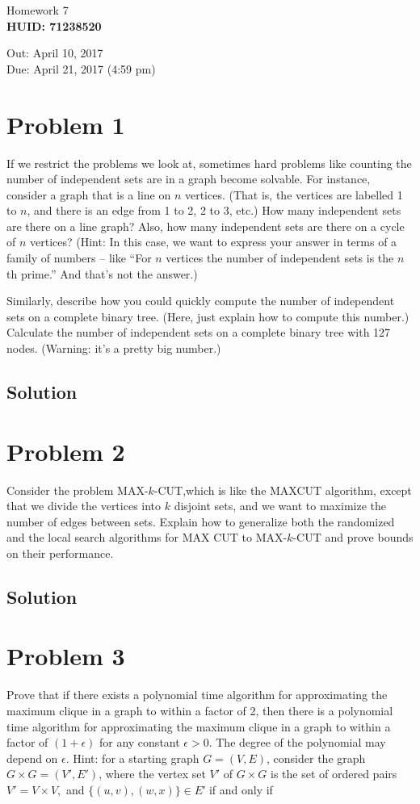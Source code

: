 \documentclass[11pt]{article}
\begin{document}
\begin{center} Homework 7 \\
\textbf{HUID: 71238520}
\end{center}
\begin{flushright}
Out: April 10, 2017\\
Due: April 21, 2017 (4:59 pm)
\end{flushright}

\section{Problem 1}
If we restrict the problems we look at, sometimes hard problems like counting the number of independent sets are in a graph become solvable. For instance, consider a graph that is a line on $n$ vertices. (That is, the vertices are labelled 1 to $n$, and there is an edge from 1 to 2, 2 to 3, etc.) How many independent sets are there on a line graph? Also, how many independent sets are there on a cycle of $n$ vertices? (Hint: In this case, we want to express your answer in terms of a family of numbers – like “For $n$ vertices the number of independent sets is the $n$th prime.” And that’s not the answer.)

Similarly, describe how you could quickly compute the number of independent sets on a complete binary tree. (Here, just explain how to compute this number.) Calculate the number of independent sets on a complete binary tree with 127 nodes. (Warning: it’s a pretty big number.)
\subsection{Solution}

\section{Problem 2}
Consider the problem MAX-$k$-CUT,which is like the MAXCUT algorithm, except that we divide the vertices into $k$ disjoint sets, and we want to maximize the number of edges between sets. Explain how to generalize both the randomized and the local search algorithms for MAX CUT to MAX-$k$-CUT and prove bounds on their performance.
\subsection{Solution}

\section{Problem 3}
Prove that if there exists a polynomial time algorithm for approximating the maximum clique in a graph to within a factor of 2, then there is a polynomial time algorithm for approximating the maximum clique in a graph to within a factor of $(1 + \epsilon)$ for any constant $\epsilon > 0$. The degree of the polynomial may depend on $\epsilon$. Hint: for a starting graph $G = (V,E)$, consider the graph $G \times G = (V′,E′)$, where the vertex set $V′$ of $G \times G$ is the set of ordered pairs $V′ = V \times V,$ and $\{(u,v),(w,x)\} \in E$′ if and only if
\end{document}
